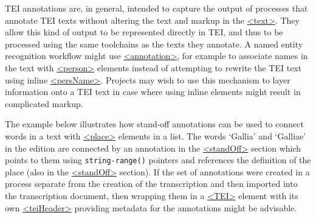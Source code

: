 \par
TEI annotations are, in general, intended to capture the output of processes that annotate TEI texts without altering the text and markup in the \hyperref[TEI.text]{<text>}. They allow this kind of output to be represented directly in TEI, and thus to be processed using the same toolchains as the texts they annotate. A named entity recognition workflow might use \hyperref[TEI.annotation]{<annotation>}, for example to associate names in the text with \hyperref[TEI.person]{<person>} elements instead of attempting to rewrite the TEI text using inline \hyperref[TEI.persName]{<persName>}. Projects may wish to use this mechanism to layer information onto a TEI text in case where using inline elements might result in complicated markup.\par
The example below illustrates how stand-off annotations can be used to connect words in a text with \hyperref[TEI.place]{<place>} elements in a list. The words ‘Gallia’ and ‘Galliae’ in the edition are connected by an annotation in the \hyperref[TEI.standOff]{<standOff>} section which points to them using \texttt{string-range()} pointers and references the definition of the place (also in the \hyperref[TEI.standOff]{<standOff>} section). If the set of annotations were created in a process separate from the creation of the transcription and then imported into the transcription document, then wrapping them in a \hyperref[TEI.TEI]{<TEI>} element with its own \hyperref[TEI.teiHeader]{<teiHeader>} providing metadata for the annotations might be advisable. 